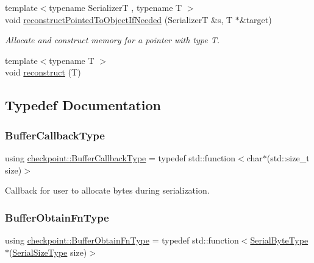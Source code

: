 \begin{DoxyCompactItemize}
{\footnotesize template$<$typename SerializerT , typename T $>$ }\\void \hyperlink{namespacecheckpoint_a9ffb72abb4d8c3fe031626dbf526d70c}{reconstruct\+Pointed\+To\+Object\+If\+Needed} (SerializerT \&s, T $\ast$\&target)
\begin{DoxyCompactList}\small\item\em Allocate and construct memory for a pointer with type {\ttfamily T}. \end{DoxyCompactList}\item 
{\footnotesize template$<$typename T $>$ }\\void \hyperlink{namespacecheckpoint_a6254f2e220f905a2b0c797c08092a7a1}{reconstruct} (T)
\end{DoxyCompactItemize}


\subsection{Typedef Documentation}
\mbox{\label{namespacecheckpoint_a70bc1b37eae8e32129df38d981ef90f6}} 
\subsubsection{\texorpdfstring{Buffer\+Callback\+Type}{BufferCallbackType}}
{\footnotesize\ttfamily using \hyperlink{namespacecheckpoint_a70bc1b37eae8e32129df38d981ef90f6}{checkpoint\+::\+Buffer\+Callback\+Type} = typedef std\+::function$<$char$\ast$(std\+::size\+\_\+t size)$>$}



Callback for user to allocate bytes during serialization. 

\mbox{\label{namespacecheckpoint_a8a2558a1dd0db386339dd81c193b7f10}} 
\subsubsection{\texorpdfstring{Buffer\+Obtain\+Fn\+Type}{BufferObtainFnType}}
{\footnotesize\ttfamily using \hyperlink{namespacecheckpoint_a8a2558a1dd0db386339dd81c193b7f10}{checkpoint\+::\+Buffer\+Obtain\+Fn\+Type} = typedef std\+::function$<$\hyperlink{namespacecheckpoint_ae57f01cdc0b81776c23b6c7c934c58f5}{Serial\+Byte\+Type}$\ast$(\hyperlink{namespacecheckpoint_a083f6674da3f94c2901b18c6d238217c}{Serial\+Size\+Type} size)$>$}

